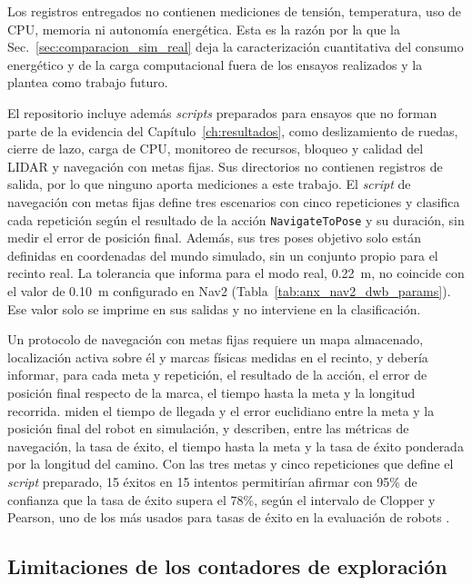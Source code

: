 \begin{appendices}
Los registros entregados no contienen mediciones de tensión, temperatura, uso
de CPU, memoria ni autonomía energética. Esta es la razón por la que la
Sec.~\ref{sec:comparacion_sim_real} deja la caracterización cuantitativa del
consumo energético y de la carga computacional fuera de los ensayos realizados
y la plantea como trabajo futuro.

El repositorio incluye además \textit{scripts} preparados para ensayos que no forman
parte de la evidencia del Capítulo~\ref{ch:resultados}, como deslizamiento de
ruedas, cierre de lazo, carga de CPU, monitoreo de recursos, bloqueo y calidad
del \gls{LIDAR} y navegación con metas fijas. Sus directorios no contienen
registros de salida, por lo que ninguno aporta mediciones a este trabajo. El
\textit{script} de navegación con metas fijas define tres escenarios con cinco
repeticiones y clasifica cada repetición según el resultado de la acción
\texttt{NavigateToPose} y su duración, sin medir el error de posición final.
Además, sus tres poses objetivo solo están definidas en coordenadas del mundo
simulado, sin un conjunto propio para el recinto real.
La tolerancia que informa para el modo real, 0.22~m, no coincide con el valor
de 0.10~m configurado en Nav2 (Tabla~\ref{tab:anx_nav2_dwb_params}). Ese valor
solo se imprime en sus salidas y no interviene en la clasificación.

Un protocolo de navegación con metas fijas requiere un mapa almacenado,
localización activa sobre él y marcas físicas medidas en el recinto, y debería
informar, para cada meta y repetición, el resultado de la acción, el error de
posición final respecto de la marca, el tiempo hasta la meta y la longitud
recorrida. \citet{ngoc2023efficient} miden el tiempo de llegada y el error
euclidiano entre la meta y la posición final del robot en simulación, y
\citet{francis2025principles} describen, entre las métricas de navegación, la
tasa de éxito, el tiempo hasta la meta y la tasa de éxito ponderada por la
longitud del camino. Con las tres metas y cinco repeticiones que define el
\textit{script} preparado, 15 éxitos en 15 intentos permitirían afirmar con 95\%
de confianza que la tasa de éxito supera el 78\%, según el intervalo de Clopper
y Pearson, uno de los más usados para tasas de éxito en la evaluación de robots
\citep{vincent2024generalizable}.

\subsection{Limitaciones de los contadores de exploración}


\end{appendices}
